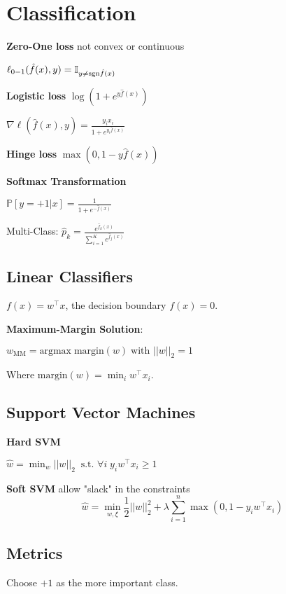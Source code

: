 \section*{Classification}

\textbf{Zero-One loss} \quad not convex or continuous

\qquad \qquad $\ell_{0-1}(\hat{f}(x), y) = \mathbb{I}_{y \neq \text{sgn} \hat{f}(x)}$

\textbf{Logistic loss} \quad $\log(1 + e^{y \hat{f}(x)})$

\qquad \qquad $\nabla \ell(\hat{f}(x), y) = \frac{y_i x_i}{1 + e^{y_i \hat{f}(x)}}$

\textbf{Hinge loss} \quad $\max(0, 1-y \hat{f}(x))$ \smallskip

\textbf{Softmax Transformation} 

\qquad \qquad $\mathbb{P}[y = +1 | x] = \frac{1}{1 + e^{- \hat{f}(x)}}$

Multi-Class: $\hat{p}_k = \frac{e^{\hat{f}_k(x)}}{\sum_{i=1}^K e^{\hat{f}_j(x)}}$

\subsection*{Linear Classifiers}

$f(x) = w^\top x$, the decision boundary $f(x) = 0$. \smallskip

\textbf{Maximum-Margin Solution}:

\quad $w_\text{MM} = \text{argmax} \; \text{margin} (w) \; \text{with } ||w||_2 = 1$

Where $\text{margin} (w) = \min_i w^\top x_i$.
 
\subsection*{Support Vector Machines}
\textbf{Hard SVM}

\qquad $\hat{w} = \min_w ||w||_2 \; \; \text{s.t. } \forall i \;y_i w^\top x_i \geq 1$
 
\textbf{Soft SVM} \quad allow "slack" in the constraints
$$\hat{w} = \min_{w, \xi} \frac{1}{2} ||w||_2^2 + \lambda \sum_{i=1}^n \max (0, 1 - y_i w^\top x_i)$$

\subsection*{Metrics} 
Choose $+1$ as the more important class. \\[-18pt]


